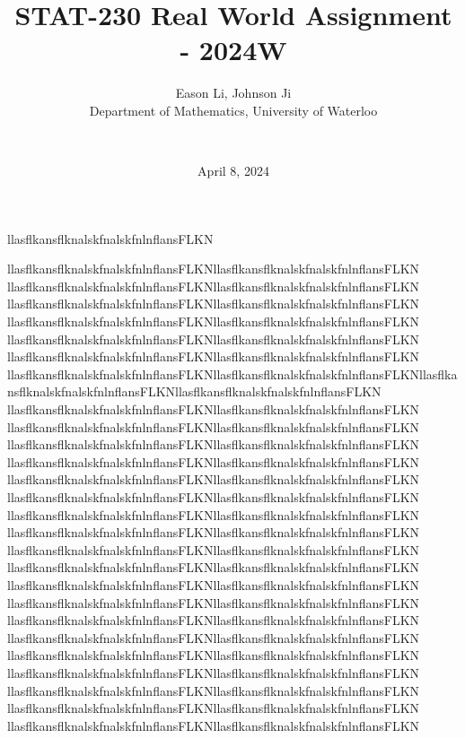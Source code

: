 \documentclass[final]{beamer}
\title{STAT-230 Real World Assignment - 2024W}
\author{
    Eason Li, Johnson Ji \\
    Department of Mathematics, University of Waterloo \and \\
}
\date{April 8, 2024} %
\begin{document}
\maketitle


\begin{minipage}{.5\textwidth}
    llasflkansflknalskfnalskfnlnflansFLKN
\end{minipage} 

\begin{minipage}{0.5\textwidth}
    llasflkansflknalskfnalskfnlnflansFLKNllasflkansflknalskfnalskfnlnflansFLKN
    llasflkansflknalskfnalskfnlnflansFLKNllasflkansflknalskfnalskfnlnflansFLKN
    llasflkansflknalskfnalskfnlnflansFLKNllasflkansflknalskfnalskfnlnflansFLKN
    llasflkansflknalskfnalskfnlnflansFLKNllasflkansflknalskfnalskfnlnflansFLKN
    llasflkansflknalskfnalskfnlnflansFLKNllasflkansflknalskfnalskfnlnflansFLKN
    llasflkansflknalskfnalskfnlnflansFLKNllasflkansflknalskfnalskfnlnflansFLKN    llasflkansflknalskfnalskfnlnflansFLKNllasflkansflknalskfnalskfnlnflansFLKNllasflkansflknalskfnalskfnlnflansFLKNllasflkansflknalskfnalskfnlnflansFLKN    llasflkansflknalskfnalskfnlnflansFLKNllasflkansflknalskfnalskfnlnflansFLKN
    llasflkansflknalskfnalskfnlnflansFLKNllasflkansflknalskfnalskfnlnflansFLKN
    llasflkansflknalskfnalskfnlnflansFLKNllasflkansflknalskfnalskfnlnflansFLKN    llasflkansflknalskfnalskfnlnflansFLKNllasflkansflknalskfnalskfnlnflansFLKN
    llasflkansflknalskfnalskfnlnflansFLKNllasflkansflknalskfnalskfnlnflansFLKN
    llasflkansflknalskfnalskfnlnflansFLKNllasflkansflknalskfnalskfnlnflansFLKN
    llasflkansflknalskfnalskfnlnflansFLKNllasflkansflknalskfnalskfnlnflansFLKN
    llasflkansflknalskfnalskfnlnflansFLKNllasflkansflknalskfnalskfnlnflansFLKN
    llasflkansflknalskfnalskfnlnflansFLKNllasflkansflknalskfnalskfnlnflansFLKN
    llasflkansflknalskfnalskfnlnflansFLKNllasflkansflknalskfnalskfnlnflansFLKN
    llasflkansflknalskfnalskfnlnflansFLKNllasflkansflknalskfnalskfnlnflansFLKN
    llasflkansflknalskfnalskfnlnflansFLKNllasflkansflknalskfnalskfnlnflansFLKN
    llasflkansflknalskfnalskfnlnflansFLKNllasflkansflknalskfnalskfnlnflansFLKN
    llasflkansflknalskfnalskfnlnflansFLKNllasflkansflknalskfnalskfnlnflansFLKN
    llasflkansflknalskfnalskfnlnflansFLKNllasflkansflknalskfnalskfnlnflansFLKN
    llasflkansflknalskfnalskfnlnflansFLKNllasflkansflknalskfnalskfnlnflansFLKN
    llasflkansflknalskfnalskfnlnflansFLKNllasflkansflknalskfnalskfnlnflansFLKN
    llasflkansflknalskfnalskfnlnflansFLKNllasflkansflknalskfnalskfnlnflansFLKN
    llasflkansflknalskfnalskfnlnflansFLKNllasflkansflknalskfnalskfnlnflansFLKN

\end{minipage}
\end{document}
